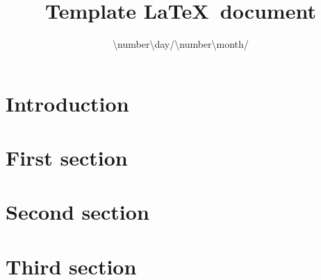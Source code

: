 \documentclass{article}
\title{\texorpdfstring{\Huge Template \LaTeX\ document}{Template LaTeX document}}
\author{}
\date{\num[minimum-integer-digits = 2]{\number\day}/\num[minimum-integer-digits = 2]{\number\month}/\number\year}  %
\begin{document}
\maketitle
\thispagestyle{empty}
\vspace{3cm}

\section*{Introduction} 


\clearpage
\boldmath
\tableofcontents
\unboldmath
\clearpage



\section{First section}


\section{Second section}


\section{Third section}



\newpage
\nocite{*}
\printbibliography[heading=bibintoc]
\end{document}
